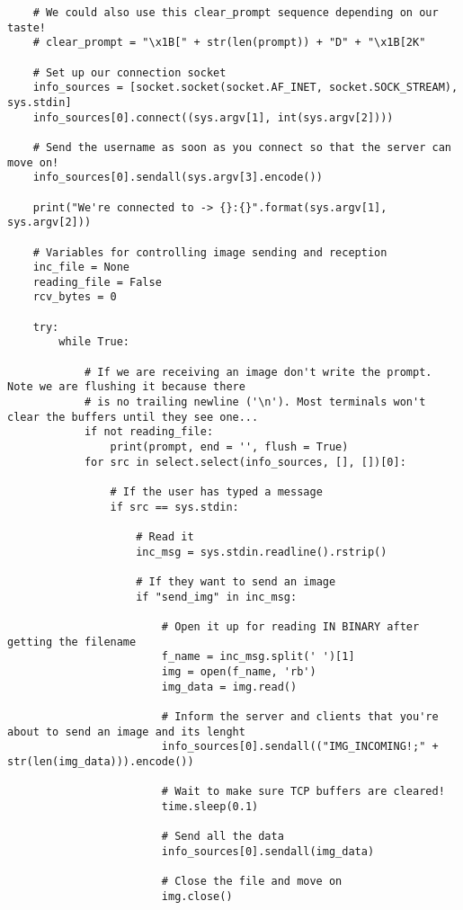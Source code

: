 \documentclass[landscape]{article}
\begin{document}
\begin{verbatim}
    # We could also use this clear_prompt sequence depending on our taste!
    # clear_prompt = "\x1B[" + str(len(prompt)) + "D" + "\x1B[2K"

    # Set up our connection socket
    info_sources = [socket.socket(socket.AF_INET, socket.SOCK_STREAM), sys.stdin]
    info_sources[0].connect((sys.argv[1], int(sys.argv[2])))

    # Send the username as soon as you connect so that the server can move on!
    info_sources[0].sendall(sys.argv[3].encode())

    print("We're connected to -> {}:{}".format(sys.argv[1], sys.argv[2]))

    # Variables for controlling image sending and reception
    inc_file = None
    reading_file = False
    rcv_bytes = 0

    try:
        while True:

            # If we are receiving an image don't write the prompt. Note we are flushing it because there
            # is no trailing newline ('\n'). Most terminals won't clear the buffers until they see one...
            if not reading_file:
                print(prompt, end = '', flush = True)
            for src in select.select(info_sources, [], [])[0]:

                # If the user has typed a message
                if src == sys.stdin:

                    # Read it
                    inc_msg = sys.stdin.readline().rstrip()

                    # If they want to send an image
                    if "send_img" in inc_msg:

                        # Open it up for reading IN BINARY after getting the filename
                        f_name = inc_msg.split(' ')[1]
                        img = open(f_name, 'rb')
                        img_data = img.read()

                        # Inform the server and clients that you're about to send an image and its lenght
                        info_sources[0].sendall(("IMG_INCOMING!;" + str(len(img_data))).encode())

                        # Wait to make sure TCP buffers are cleared!
                        time.sleep(0.1)

                        # Send all the data
                        info_sources[0].sendall(img_data)

                        # Close the file and move on
                        img.close()


\end{verbatim}
\end{document}
